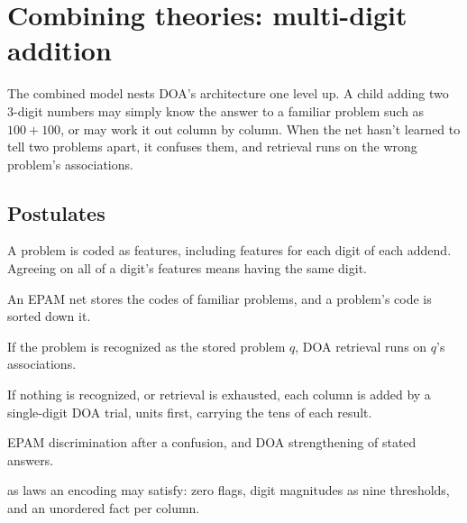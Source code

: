 \documentclass[11pt]{article}
\begin{document}
\section{Combining theories: multi-digit addition}
\label{sec:multidigit}

The combined model nests DOA's architecture one level up. A child adding two 3-digit numbers may simply know the answer to a familiar problem such as $100+100$, or may work it out column by column. When the net hasn't learned to tell two problems apart, it confuses them, and retrieval runs on the wrong problem's associations.

\subsection{Postulates}

\begin{description}[leftmargin=1.5em]
  \item[M1, problem code.] A problem is coded as features, including features for each digit of each addend. Agreeing on all of a digit's features means having the same digit.
  \item[M2, recognition.] An EPAM net stores the codes of familiar problems, and a problem's code is sorted down it.
  \item[M3, whole-problem retrieval.] If the problem is recognized as the stored problem $q$, DOA retrieval runs on $q$'s associations.
  \item[M4, column backup.] If nothing is recognized, or retrieval is exhausted, each column is added by a single-digit DOA trial, units first, carrying the tens of each result.
  \item[M5, learning.] EPAM discrimination after a confusion, and DOA strengthening of stated answers.
  \item[M1a--M1c, further features,] as laws an encoding may satisfy: zero flags, digit magnitudes as nine thresholds, and an unordered fact per column.
\end{description}
\end{document}

